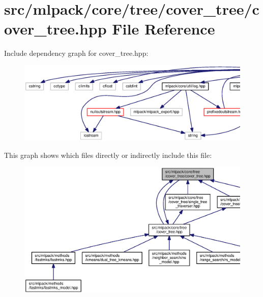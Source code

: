 \section{src/mlpack/core/tree/cover\+\_\+tree/cover\+\_\+tree.hpp File Reference}
\label{cover__tree_2cover__tree_8hpp}
Include dependency graph for cover\+\_\+tree.\+hpp\+:
\nopagebreak
\begin{figure}[H]
\begin{center}
\leavevmode
\includegraphics[width=350pt]{cover__tree_2cover__tree_8hpp__incl}
\end{center}
\end{figure}
This graph shows which files directly or indirectly include this file\+:
\nopagebreak
\begin{figure}[H]
\begin{center}
\leavevmode
\includegraphics[width=350pt]{cover__tree_2cover__tree_8hpp__dep__incl}
\end{center}
\end{figure}
